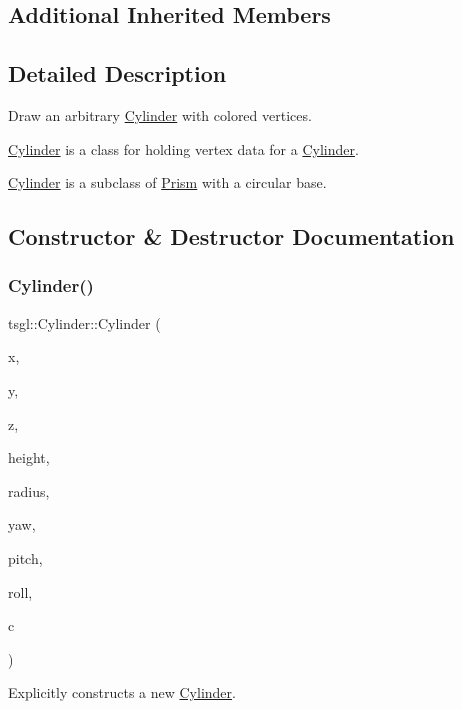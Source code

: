 \subsection*{Additional Inherited Members}


\subsection{Detailed Description}
Draw an arbitrary \hyperlink{classtsgl_1_1_cylinder}{Cylinder} with colored vertices. 

\hyperlink{classtsgl_1_1_cylinder}{Cylinder} is a class for holding vertex data for a \hyperlink{classtsgl_1_1_cylinder}{Cylinder}.

\hyperlink{classtsgl_1_1_cylinder}{Cylinder} is a subclass of \hyperlink{classtsgl_1_1_prism}{Prism} with a circular base. 

\subsection{Constructor \& Destructor Documentation}
\mbox{\label{classtsgl_1_1_cylinder_a4b55b973ed7ac64dcda9a792a8b4d4f7}} 
\subsubsection{\texorpdfstring{Cylinder()}{Cylinder()}}
{\footnotesize\ttfamily tsgl\+::\+Cylinder\+::\+Cylinder (\begin{DoxyParamCaption}\item[{float}]{x,  }\item[{float}]{y,  }\item[{float}]{z,  }\item[{G\+Lfloat}]{height,  }\item[{G\+Lfloat}]{radius,  }\item[{float}]{yaw,  }\item[{float}]{pitch,  }\item[{float}]{roll,  }\item[{\hyperlink{structtsgl_1_1_color_float}{Color\+Float}}]{c }\end{DoxyParamCaption})}



Explicitly constructs a new \hyperlink{classtsgl_1_1_cylinder}{Cylinder}. 

